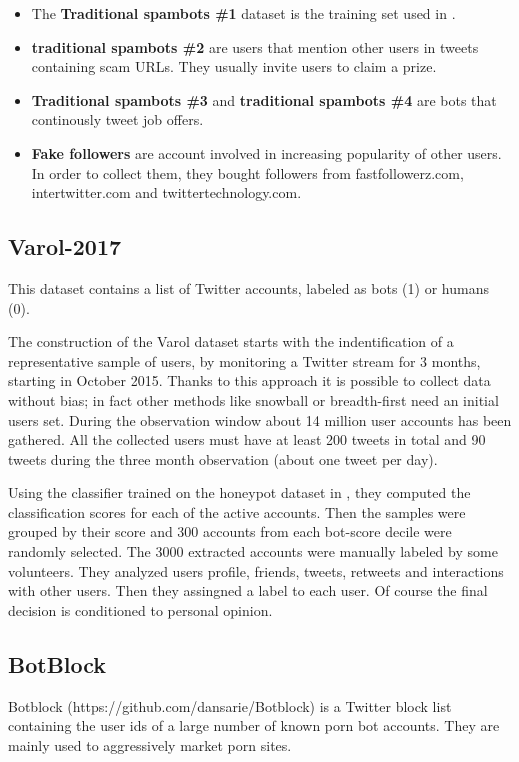 \begin{itemize}
	\item The \textbf{Traditional spambots \#1} dataset is the training set used in \cite{Yang}.
	\item \textbf{traditional spambots \#2} are users that mention other users in tweets containing scam URLs. They usually invite users to claim a prize.
	\item  \textbf{Traditional spambots \#3} and \textbf{traditional spambots \#4} are bots that continously tweet job offers.
	\item \textbf{Fake followers} are account involved in increasing popularity of other users. In order to collect them, they bought followers from fastfollowerz.com, intertwitter.com and twittertechnology.com. \cite{Cresci}
\end{itemize}


\subsection{Varol-2017}
This dataset contains a list of Twitter accounts, labeled as bots (1) or humans (0).

The construction of the Varol dataset starts with the indentification of a representative sample of users, by monitoring a Twitter stream for 3 months, starting in October 2015. Thanks to this approach it is possible to collect data without bias; in fact other methods like snowball or breadth-first need an initial users set.
During the observation window about 14 million user accounts has been gathered. 
All the collected users must have at least 200 tweets in total and 90 tweets during the three month observation (about one tweet per day).

Using the classifier trained on the honeypot dataset in \cite{Lee11sevenmonths}, they computed the classification scores for each of the active accounts.
Then the samples were grouped by their score and 300 accounts from each bot-score decile were randomly selected. 
The 3000 extracted accounts were manually labeled by some volunteers. They analyzed users profile, friends, tweets, retweets and interactions with other users. Then they assingned a label to each user.
Of course the final decision is conditioned to personal opinion\cite{Varol}.

\subsection{BotBlock}
Botblock (https://github.com/dansarie/Botblock) is a Twitter block list containing the user ids of a large number of known porn bot accounts.
They are mainly used to aggressively market porn sites.


